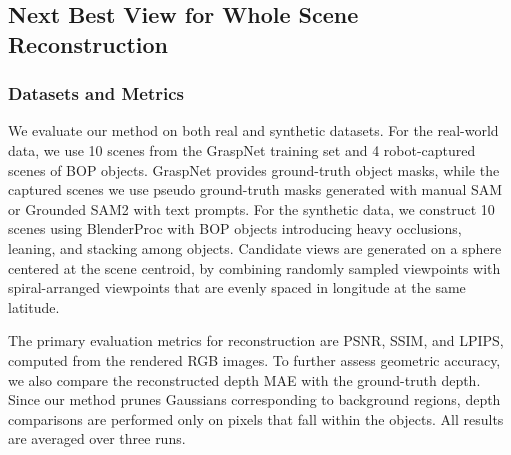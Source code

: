 \subsection{Next Best View for Whole Scene Reconstruction}
\subsubsection{Datasets and Metrics}

We evaluate our method on both real and synthetic datasets. For the real-world data, we use 10 scenes from the GraspNet \cite{fang2020graspnet} training set and 4 robot-captured scenes of BOP objects. GraspNet provides ground-truth object masks, while the captured scenes we use pseudo ground-truth masks generated with manual SAM or Grounded SAM2 \cite{ren2024grounded} with text prompts. For the synthetic data, we construct 10 scenes using BlenderProc \cite{denninger2019blenderproc} with BOP objects introducing heavy occlusions, leaning, and stacking among objects. Candidate views are generated on a sphere centered at the scene centroid, by combining randomly sampled viewpoints with spiral-arranged viewpoints that are evenly spaced in longitude at the same latitude.



The primary evaluation metrics for reconstruction are PSNR, SSIM, and LPIPS, computed from the rendered RGB images. To further assess geometric accuracy, we also compare the reconstructed depth MAE with the ground-truth depth. Since our method prunes Gaussians corresponding to background regions, depth comparisons are performed only on pixels that fall within the objects. All results are averaged over three runs.

